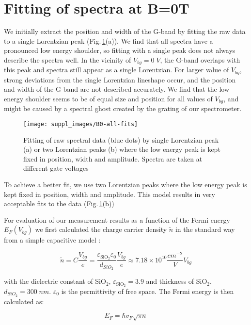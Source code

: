 \documentclass[pra,aps,superscriptaddress,preprint]{revtex4-1}
\begin{document}
\section{Fitting of spectra at B=0T}
We initially extract the position and width of the G-band by fitting the raw data to a single Lorentzian peak (Fig.\,\ref{b0-all-fits}(a)). We find that all spectra have a pronounced low energy shoulder, so fitting with a single peak does not always describe the spectra well. In the vicinity of $V_{bg}=0\; V$, the G-band overlaps with this peak and spectra still appear as a single Lorentzian. For larger value of $V_{bg}$, strong deviations from the single Lorentzian lineshape occur, and the position and width of the G-band are not described accurately. We find that the low energy shoulder seems to be of equal size and position for all values of $V_{bg}$, and might be caused by a spectral ghost created by the grating of our spectrometer. 

\begin{figure}
   \texttt{[image: suppl\_images/B0-all-fits]}
   \caption{\label{b0-all-fits}Fitting of raw spectral data (blue dots) by single Lorentzian peak (a) or two Lorentzian peaks (b) where the low energy peak is kept fixed in position, width and amplitude. Spectra are taken at different gate voltages}
\end{figure}

To achieve a better fit, we use two Lorentzian peaks where the low energy peak is kept fixed in position, width and amplitude. This model results in very acceptable fits to the data (Fig.\,\ref{b0-all-fits}(b))   

For evaluation of our measurement results as a function of the Fermi energy $E_F(V_{bg})$ we first calculated the charge carrier density $\widetilde{n}$ in the standard way from a simple capacitive model \cite{novoselov2004electric}: 

\noindent
\begin{equation}
\label{CalculationDensity}
\widetilde{n}=C\frac{V_{bg}}{e}=\frac{\varepsilon_{\mathrm{SiO}_2}\varepsilon_0}{d_{SiO_2}}\frac{V_{bg}}{e}\approx 7.18\times10^{10}\frac{cm^{-2}}{V}V_{bg}
\end{equation}

\noindent
with the dielectric constant of SiO$_2$, $\varepsilon_{\mathrm{SiO}_2}=3.9$ and thickness of SiO$_2$, $d_{SiO_2}=300\; nm$. $\varepsilon_0$ is the permittivity of free space. The Fermi energy is then calculated as:

\noindent
\begin{equation}
\label{CalculationFermiEnergy}
E_F = \hbar v_F \sqrt{\pi n}
\end{equation}
\end{document}
